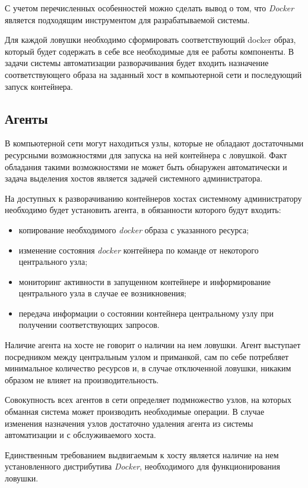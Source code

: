С учетом перечисленных особенностей можно сделать вывод о том, что \textit{Docker} является подходящим инструментом для разрабатываемой системы.

Для каждой ловушки необходимо сформировать соответствующий docker образ, который будет содержать в себе все необходимые для ее работы компоненты. В задачи системы автоматизации разворачивания будет входить назначение соответствующего образа на заданный хост в компьютерной сети и последующий запуск контейнера.

\subsection{Агенты}

В компьютерной сети могут находиться узлы, которые не обладают достаточными ресурсными возможностями для запуска на ней контейнера с ловушкой. Факт обладания такими возможностями не может быть обнаружен автоматически и задача выделения хостов является задачей системного администратора.

На доступных к разворачиванию контейнеров хостах системному администратору необходимо будет установить агента, в обязанности которого будут входить:

\begin{itemize}
\item копирование необходимого \textit{docker} образа с указанного ресурса;
\item изменение состояния \textit{docker} контейнера по команде от некоторого центрального узла;
\item мониторинг активности в запущенном контейнере и информирование центрального узла в случае ее возникновения;
\item передача информации о состоянии контейнера центральному узлу при получении соответствующих запросов.
\end{itemize}

Наличие агента на хосте не говорит о наличии на нем ловушки. Агент выступает посредником между центральным узлом и приманкой, сам по себе потребляет минимальное количество ресурсов и, в случае отключенной ловушки, никаким образом не влияет на производительность.

Совокупность всех агентов в сети определяет подмножество узлов, на которых обманная система может производить необходимые операции. В случае изменения назначения узлов достаточно удаления агента из системы автоматизации и с обслуживаемого хоста.

Единственным требованием выдвигаемым к хосту является наличие на нем установленного дистрибутива \textit{Docker}, необходимого для функционирования ловушки.

